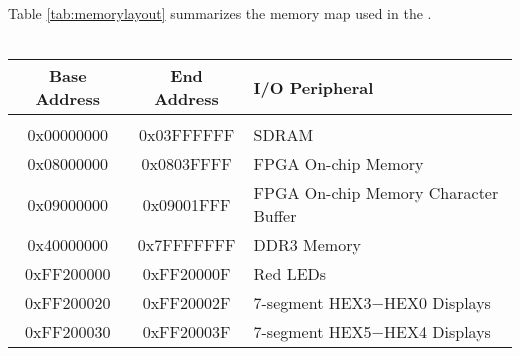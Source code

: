 \noindent
Table \ref{tab:memorylayout} summarizes the memory map used in the \systemName.
~\\
~\\

\begin{table}[h]
    \begin{center}
    \begin{tabular}{c|c|l}
            \textbf{Base Address}
            & \textbf{End Address}
            & \textbf{I/O Peripheral}
				\\\hline\vspace{-3mm}\\
            0x00000000
            & 0x03FFFFFF
            & SDRAM
        \\
            0x08000000
            & 0x0803FFFF
            & FPGA On-chip Memory
        \\
            0x09000000
            & 0x09001FFF
            & FPGA On-chip Memory Character Buffer
        \\
            0x40000000
            & 0x7FFFFFFF
            & DDR3 Memory
        \\
            0xFF200000
            & 0xFF20000F
            & Red LEDs
        \\
            0xFF200020
            & 0xFF20002F
            & 7-segment HEX3$-$HEX0 Displays
        \\
            0xFF200030
            & 0xFF20003F
            & 7-segment HEX5$-$HEX4 Displays


\end{tabular}
\end{center}
\end{table}
